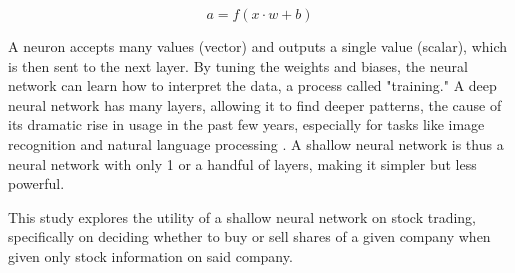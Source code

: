 \documentclass[twocolumn]{article}
\begin{document}
\begin{equation}
a = f ( x \cdot w + b )
\end{equation}

A neuron accepts many values (vector) and outputs a single value (scalar), which is then sent to the next layer. By tuning the weights and biases, the neural network can learn how to interpret the data, a process called "training." A deep neural network has many layers, allowing it to find deeper patterns, the cause of its dramatic rise in usage in the past few years, especially for tasks like image recognition and natural language processing \cite{wired}. A shallow neural network is thus a neural network with only 1 or a handful of layers, making it simpler but less powerful.

This study explores the utility of a shallow neural network on stock trading, specifically on deciding whether to buy or sell shares of a given company when given only stock information on said company.


\end{document}
